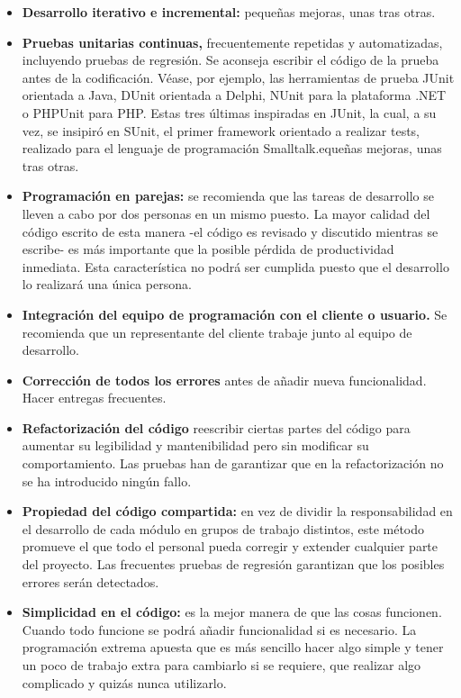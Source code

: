 \begin{itemize}
  \item \textbf{Desarrollo iterativo e incremental:} pequeñas mejoras, unas tras otras.
  \item \textbf{Pruebas unitarias continuas,} frecuentemente repetidas y automatizadas, incluyendo pruebas de regresión. Se aconseja escribir el código de la prueba antes de la codificación. Véase, por ejemplo, las herramientas de prueba JUnit orientada a Java, DUnit orientada a Delphi, NUnit para la plataforma .NET o PHPUnit para PHP. Estas tres últimas inspiradas en JUnit, la cual, a su vez, se insipiró en SUnit, el primer framework orientado a realizar tests, realizado para el lenguaje de programación Smalltalk.equeñas mejoras, unas tras otras.
  \item \textbf{Programación en parejas:} se recomienda que las tareas de desarrollo se lleven a cabo por dos personas en un mismo puesto. La mayor calidad del código escrito de esta manera -el código es revisado y discutido mientras se escribe- es más importante que la posible pérdida de productividad inmediata. Esta característica no podrá ser cumplida puesto que el desarrollo lo realizará una única persona.
  \item \textbf{Integración del equipo de programación con el cliente o usuario.} Se recomienda que un representante del cliente trabaje junto al equipo de desarrollo.
  \item \textbf{Corrección de todos los errores} antes de añadir nueva funcionalidad. Hacer entregas frecuentes.
  \item \textbf{Refactorización del código} reescribir ciertas partes del código para aumentar su legibilidad y mantenibilidad pero sin modificar su comportamiento. Las pruebas han de garantizar que en la refactorización no se ha introducido ningún fallo.
  \item \textbf{Propiedad del código compartida:} en vez de dividir la responsabilidad en el desarrollo de cada módulo en grupos de trabajo distintos, este método promueve el que todo el personal pueda corregir y extender cualquier parte del proyecto. Las frecuentes pruebas de regresión garantizan que los posibles errores serán detectados.
  \item \textbf{Simplicidad en el código: } es la mejor manera de que las cosas funcionen. Cuando todo funcione se podrá añadir funcionalidad si es necesario. La programación extrema apuesta que es más sencillo hacer algo simple y tener un poco de trabajo extra para cambiarlo si se requiere, que realizar algo complicado y quizás nunca utilizarlo.
\end{itemize}
